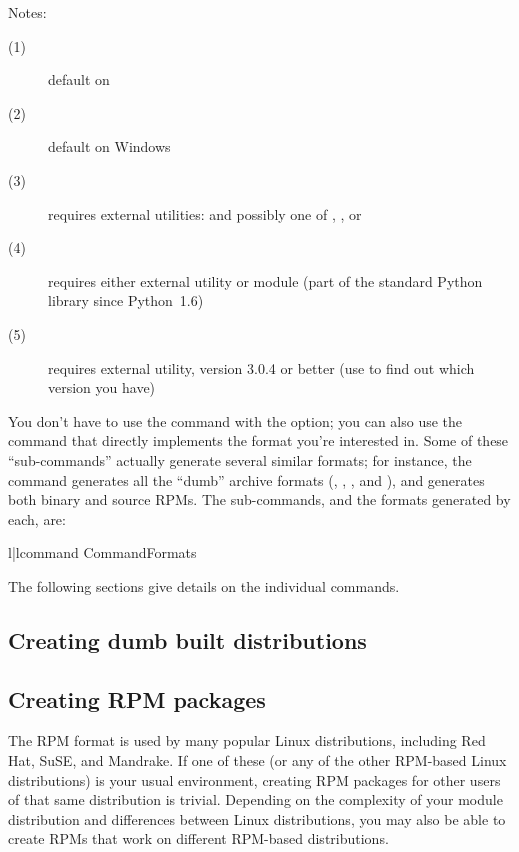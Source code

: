 \documentclass{howto}
\begin{document}
\noindent Notes:
\begin{description}
\item[(1)] default on \UNIX
\item[(2)] default on Windows 
\item[(3)] requires external utilities:  and possibly one
  of , , or 
\item[(4)] requires either external  utility or
   module (part of the standard Python library since
  Python~1.6)
\item[(5)] requires external  utility, version 3.0.4 or
  better (use  to find out which version you have)
\end{description}

You don't have to use the  command with the
 option; you can also use the command that
directly implements the format you're interested in.  Some of these
 ``sub-commands'' actually generate several similar
formats; for instance, the  command generates all
the ``dumb'' archive formats (, , , and
), and  generates both binary and source
RPMs.  The  sub-commands, and the formats generated by
each, are:
\begin{tableii}{l|l}{command}%
  {Command}{Formats}
\end{tableii}

The following sections give details on the individual 
commands.


\subsection{Creating dumb built distributions}
\label{creating-dumb}



\subsection{Creating RPM packages}
\label{creating-rpms}

The RPM format is used by many popular Linux distributions, including
Red Hat, SuSE, and Mandrake.  If one of these (or any of the other
RPM-based Linux distributions) is your usual environment, creating RPM
packages for other users of that same distribution is trivial.
Depending on the complexity of your module distribution and differences
between Linux distributions, you may also be able to create RPMs that
work on different RPM-based distributions.
\end{document}
